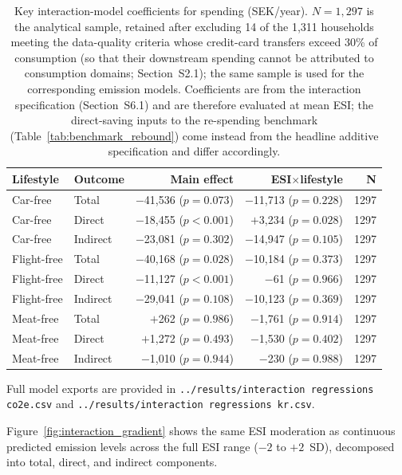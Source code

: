 \documentclass[12pt]{article}
\begin{document}
\begin{table}[!htbp]
\centering
\small
\caption{Key interaction-model coefficients for spending (SEK/year). $N=1{,}297$ is the analytical sample, retained after excluding 14 of the 1{,}311 households meeting the data-quality criteria whose credit-card transfers exceed 30\% of consumption (so that their downstream spending cannot be attributed to consumption domains; Section~S2.1); the same sample is used for the corresponding emission models. Coefficients are from the interaction specification (Section~S6.1) and are therefore evaluated at mean ESI; the direct-saving inputs to the re-spending benchmark (Table~\ref{tab:benchmark_rebound}) come instead from the headline additive specification and differ accordingly.}
\label{tab:key_reg_kr}
\begin{tabular}{llrrr}
\toprule
\textbf{Lifestyle} & \textbf{Outcome} & \textbf{Main effect} & \textbf{ESI$\times$lifestyle} & \textbf{N} \\
\midrule
Car-free & Total & $-$41{,}536 ($p=0.073$) & $-$11{,}713 ($p=0.228$) & 1297 \\
Car-free & Direct & $-$18{,}455 ($p<0.001$) & $+$3{,}234 ($p=0.028$) & 1297 \\
Car-free & Indirect & $-$23{,}081 ($p=0.302$) & $-$14{,}947 ($p=0.105$) & 1297 \\
Flight-free & Total & $-$40{,}168 ($p=0.028$) & $-$10{,}184 ($p=0.373$) & 1297 \\
Flight-free & Direct & $-$11{,}127 ($p<0.001$) & $-$61 ($p=0.966$) & 1297 \\
Flight-free & Indirect & $-$29{,}041 ($p=0.108$) & $-$10{,}123 ($p=0.369$) & 1297 \\
Meat-free & Total & $+$262 ($p=0.986$) & $-$1{,}761 ($p=0.914$) & 1297 \\
Meat-free & Direct & $+$1{,}272 ($p=0.493$) & $-$1{,}530 ($p=0.402$) & 1297 \\
Meat-free & Indirect & $-$1{,}010 ($p=0.944$) & $-$230 ($p=0.988$) & 1297 \\
\bottomrule
\end{tabular}
\end{table}

Full model exports are provided in \texttt{../results/interaction regressions co2e.csv} and \texttt{../results/interaction regressions kr.csv}.

Figure~\ref{fig:interaction_gradient} shows the same ESI moderation as continuous predicted emission levels across the full ESI range ($-2$ to $+2$~SD), decomposed into total, direct, and indirect components.
\end{document}
